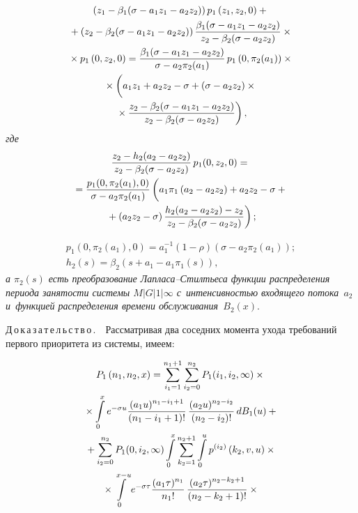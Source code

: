 \begin{multicols}{2}
\vspace*{-12pt}

\noindent
\begin{multline}
\label{n11}
\left(z_1-\beta_1(\sigma-a_1z_1-a_2z_2)\right)
p_1\left(z_1,z_2,0\right)+{}\\
{}+\left(z_2-\beta_2(\sigma-a_1z_1-a_2z_2)\right)
\fr{\beta_1(\sigma-a_1z_1-a_2z_2)}{z_2-\beta_2(\sigma-a_2z_2)}\times{}
\\
{}\times p_1\left(0,z_2,0\right)=
\fr{\beta_1(\sigma-a_1z_1-a_2z_2)}{\sigma-a_2\pi_2(a_1)}\,p_1\left(0,\pi_2(a_1)\right)\times{}\\
{}\times\left(
\vphantom{\fr{z_2-\beta_2(s+\sigma-a_1z_1-a_2z_2)}{z_2-\beta_2(s+\sigma-a_2z_2)}}
a_1z_1+a_2z_2-\sigma+\left(\sigma-a_2z_2\right)\times{}\right.\\
\left.{}\times
\fr{z_2-\beta_2(\sigma-a_1z_1-a_2z_2)}
{z_2-\beta_2(\sigma-a_2z_2)}\right),
\end{multline}
\textit{где}
\begin{multline}
\label{n12}
\fr{z_2-h_2(a_2-a_2z_2)}{z_2-\beta_2(\sigma-a_2z_2)}\,
p_1(0,z_2,0)={}\\
{}=\fr{p_1(0,\pi_2(a_1),0)}{\sigma-a_2\pi_2(a_1)}
\left(
\vphantom{\fr{z_2-\beta_2(s+\sigma-a_1z_1-a_2z_2)}{z_2-\beta_2(s+\sigma-a_2z_2)}}
a_1\pi_1\left(a_2-a_2z_2\right)+
a_2z_2-\sigma+{}\right.\\
\left.{}+\left(a_2z_2-\sigma\right)
\fr{h_2(a_2-a_2z_2)-z_2}
{z_2-\beta_2(\sigma-a_2z_2)}\right);
\end{multline}

\vspace*{-12pt}

\noindent
\begin{gather*}
p_1\left(0,\pi_2(a_1),0\right)=
a_1^{-1}(1-\rho)\left(\sigma-a_2\pi_2(a_1)\right);\\
 h_2(s)=\beta_2\left(s+a_1-a_1\pi_1(s)\right),
\end{gather*}
\textit{а $\pi_2(s)$  есть преобразование Лап\-ла\-са--Стилть\-еса функции распределения периода занятости системы $M|G|1|\infty$ с~интенсивностью входящего
потока~$a_2$ и~функцией распределения времени обслуживания~$B_2(x).$}

\smallskip

\noindent
Д\,о\,к\,а\,з\,а\,т\,е\,л\,ь\,с\,т\,в\,о\,.\ \
 Рассматривая два соседних момента ухода требований первого приоритета 
 из системы, имеем:
 
 \noindent
\begin{multline*}
P_1\left(n_1,n_2,x\right)=
\sum\limits_{i_1=1}^{n_1+1}\sum\limits_{i_2=0}^{n_2}P_1(i_1,i_2,\infty)\times{}\\
{}\times
\int\limits_0^xe^{-\sigma u}
\displaystyle\frac{\displaystyle (a_1u)^{n_1-i_1+1}\mathstrut}{\displaystyle (n_1-i_1+1)!\mathstrut}\,
\displaystyle\frac{\displaystyle (a_2u)^{n_2-i_2}\mathstrut}{\displaystyle (n_2-i_2)!\mathstrut}\,dB_1(u)+{}\\
{}+
\sum\limits_{i_2=0}^{n_2}P_1(0,i_2,\infty)\int\limits_0^x
\sum\limits_{k_2=1}^{n_2+1}\int\limits_0^u
p^{(i_2)}\left(k_2,v,u\right)\times{}\\
{}\times \int\limits_0^{x-u}e^{-\sigma\tau}
\displaystyle\frac{\displaystyle (a_1\tau)^{n_1}\mathstrut}{\displaystyle n_1!\mathstrut}\,
\displaystyle\frac{\displaystyle (a_2\tau)^{n_2-k_2+1}\mathstrut}{\displaystyle (n_2-k_2+1)!\mathstrut}\times{}
\end{multline*}


\end{multicols}
